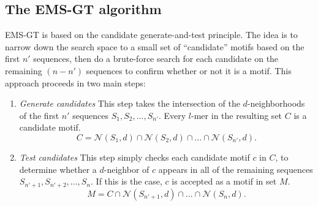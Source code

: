 \documentclass[conference]{IEEEtran}
\begin{document}
	\subsection{The EMS-GT algorithm}
		EMS-GT is based on the candidate generate-and-test principle. The idea is to narrow down the search space to a small set of ``candidate'' motifs based on the first $n'$ sequences, then do a brute-force search for each candidate on the remaining $(n - n')$ sequences to confirm whether or not it is a motif. This approach proceeds in two main steps:\newline
		\vspace{-5mm}
		\begin{enumerate}[label={\em (\alph*)}]
			\item {\em Generate candidates}\newline
			This step takes the intersection of the $d$-neighborhoods of the first $n'$ sequences $S_{1},S_{2},...,S_{n'}$. Every $l$-mer in the resulting set $C$ is a candidate motif.\newline
			\begin{equation}
			C = \mathcal{N}(S_{1}, d) \cap \mathcal{N}(S_{2}, d) \cap...\cap \mathcal{N}(S_{n'}, d).
			\end{equation} %
			\item {\em Test candidates}\newline
			This step simply checks each candidate motif $c$ in $C$, to determine whether a $d$-neighbor of $c$ appears in all of the remaining sequences $S_{n'+1},S_{n'+2},...,S_{n}$. If this is the case, $c$ is accepted as a motif in set $M$.\newline
			\begin{equation}
			M = C \cap \mathcal{N}(S_{n'+1}, d) \cap...\cap \mathcal{N}(S_{n}, d).
			\end{equation} %
			\end{enumerate}
		\newpage
\end{document}
